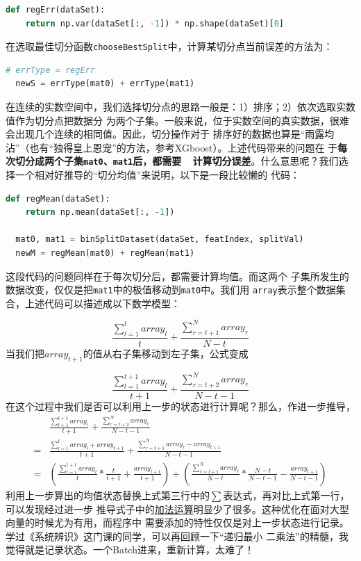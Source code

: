 \documentclass[12pt, a4paper]{article}
\begin{document}
\begin{lstlisting}[language = Python]
  def regErr(dataSet):
    return np.var(dataSet[:, -1]) * np.shape(dataSet)[0]
\end{lstlisting}
在选取最佳切分函数\texttt{chooseBestSplit}中，计算某切分点当前误差的方法为：

\begin{lstlisting}[language = Python]
  # errType = regErr
  newS = errType(mat0) + errType(mat1)
\end{lstlisting}
在连续的实数空间中，我们选择切分点的思路一般是：1）排序；2）依次选取实数值作为切分点把数据分
为两个子集。一般来说，位于实数空间的真实数据，很难会出现几个连续的相同值。因此，切分操作对于
排序好的数据也算是“雨露均沾”（也有“独得皇上恩宠”的方法，参考XGboost）。上述代码带来的问题在
于\textbf{每次切分成两个子集\texttt{mat0}、\texttt{mat1}后，都需要\ \ 计算切分误差}。什么意思呢？我们选择一个相对好推导的“切分均值”来说明，以下是一段比较懒的
代码：

\begin{lstlisting}[language = Python]
  def regMean(dataSet):
    return np.mean(dataSet[:, -1])

  mat0, mat1 = binSplitDataset(dataSet, featIndex, splitVal)
  newM = regMean(mat0) + regMean(mat1)
\end{lstlisting}
这段代码的问题同样在于每次切分后，都需要\textbf{}计算均值。而这两个
子集所发生的数据改变，仅仅是把\texttt{mat1}中的极值移动到\texttt{mat0}中。我们用
\texttt{array}表示整个数据集合，上述代码可以描述成以下数学模型：

\[
  \frac{\sum_{l=1}^{t}array_l}{t} + \frac{\sum_{r=t+1}^{N}array_r}{N-t}
\]
当我们把$array_{t+1}$的值从右子集移动到左子集，公式变成

\[
  \frac{\sum_{l=1}^{t+1}array_l}{t+1} + \frac{\sum_{r=t+2}^{N}array_r}{N-t-1}
\]
在这个过程中我们是否可以利用上一步的状态进行计算呢？那么，作进一步推导，
\begin{displaymath}
\begin{array}{ll}
    & \frac{\sum_{l=1}^{t+1}array_l}{t+1} + \frac{\sum_{r=t+2}^{N}array_r}{N-t-1} \\
  = & \frac{\sum_{l=1}^{t}array_l + array_{t+1}}{t+1} + \frac{\sum_{r=t+1}^{N}array_r - array_{t+1}}{N-t-1} \\
  = & \left(\frac{\sum_{l=1}^{t+1}array_l}{t} * \frac{t}{t+1} + \frac{array_{t+1}}{t+1}\right)
      + \left(\frac{\sum_{r=t+1}^{N}array_r}{N-t} * \frac{N-t}{N-t-1} - \frac{array_{t+1}}{N-t-1}\right)
\end{array}
\end{displaymath}
利用上一步算出的均值状态替换上式第三行中的$\sum$表达式，再对比上式第一行，可以发现经过进一步
推导式子中的\underline{加法运算}明显少了很多。这种优化在面对大型向量的时候尤为有用，而程序中
需要添加的特性仅仅是对上一步状态进行记录。学过《系统辨识》这门课的同学，可以再回顾一下“递归最小
二乘法”的精髓，我觉得就是记录状态。一个Batch进来，重新计算，太难了！
\end{document}
